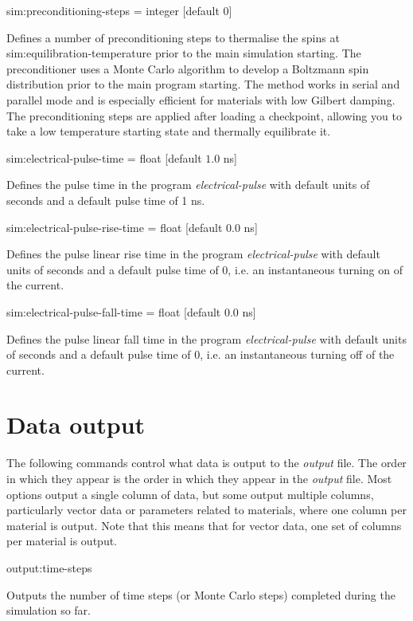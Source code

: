 {\zicf sim:preconditioning-steps = integer [default 0]} Defines a number of preconditioning steps to thermalise the spins at sim:equilibration-temperature prior to the main simulation starting. The preconditioner uses a Monte Carlo algorithm to develop a Boltzmann spin distribution prior to the main program starting. The method works in serial and parallel mode and is especially efficient for materials with low Gilbert damping. The preconditioning steps are applied after loading a checkpoint, allowing you to take a low temperature starting state and thermally equilibrate it.

{\zicf sim:electrical-pulse-time = float [default $1.0$ ns]}
Defines the pulse time in the program \textit{electrical-pulse} with default
units of seconds and a default pulse time of 1 ns.

{\zicf sim:electrical-pulse-rise-time = float [default $0.0$ ns]}
Defines the pulse linear rise time in the program \textit{electrical-pulse} with
 default units of seconds and a default pulse time of 0, i.e. an instantaneous
 turning on of the current.

{\zicf sim:electrical-pulse-fall-time = float [default $0.0$ ns]}
Defines the pulse linear fall time in the program \textit{electrical-pulse} with
 default units of seconds and a default pulse time of 0, i.e. an instantaneous
 turning off of the current.

\section*{Data output}
The following commands control what data is output to the \textit{output} file. The order in which they appear is the order in which they appear in the \textit{output} file. Most options output a single column of data, but some output multiple columns, particularly vector data or parameters related to materials, where one column per material is output. Note that this means that for vector data, one set of columns per material is output.

{\zicf output:time-steps} Outputs the number of time steps (or Monte Carlo steps) completed during the simulation so far.


